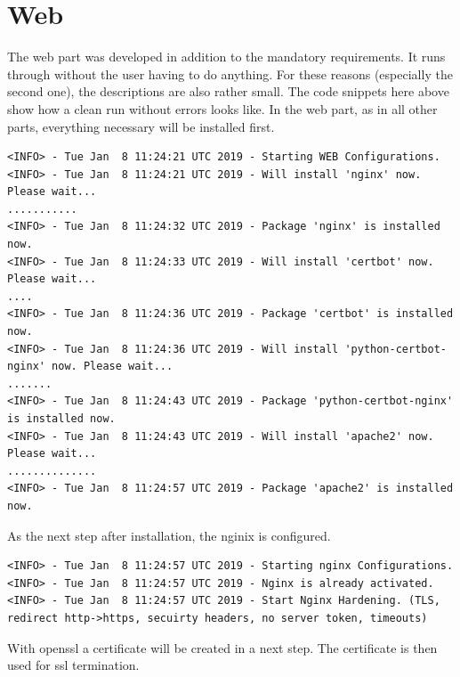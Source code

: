 \section{Web}

The web part was developed in addition to the mandatory requirements. It runs through without the user having to do anything. 
For these reasons (especially the second one), the descriptions are also rather small. The code snippets here above show how a clean run without errors looks like.
In the web part, as in all other parts, everything necessary will be installed first.

\begin{lstlisting}
<INFO> - Tue Jan  8 11:24:21 UTC 2019 - Starting WEB Configurations.
<INFO> - Tue Jan  8 11:24:21 UTC 2019 - Will install 'nginx' now. Please wait...
...........
<INFO> - Tue Jan  8 11:24:32 UTC 2019 - Package 'nginx' is installed now.
<INFO> - Tue Jan  8 11:24:33 UTC 2019 - Will install 'certbot' now. Please wait...
....
<INFO> - Tue Jan  8 11:24:36 UTC 2019 - Package 'certbot' is installed now.
<INFO> - Tue Jan  8 11:24:36 UTC 2019 - Will install 'python-certbot-nginx' now. Please wait...
.......
<INFO> - Tue Jan  8 11:24:43 UTC 2019 - Package 'python-certbot-nginx' is installed now.
<INFO> - Tue Jan  8 11:24:43 UTC 2019 - Will install 'apache2' now. Please wait...
..............
<INFO> - Tue Jan  8 11:24:57 UTC 2019 - Package 'apache2' is installed now.
\end{lstlisting}



As the next step after installation, the nginix is configured.

\begin{lstlisting}
<INFO> - Tue Jan  8 11:24:57 UTC 2019 - Starting nginx Configurations.
<INFO> - Tue Jan  8 11:24:57 UTC 2019 - Nginx is already activated.
<INFO> - Tue Jan  8 11:24:57 UTC 2019 - Start Nginx Hardening. (TLS, redirect http->https, secuirty headers, no server token, timeouts)
\end{lstlisting}

With openssl a certificate will be created in a next step. The certificate is then used for ssl termination.

